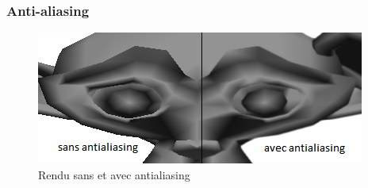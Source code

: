 \documentclass{beamer}
\begin{document}
\begin{frame}
\frametitle{Anti-aliasing}
\begin{figure}
\centering
\includegraphics[scale=0.8]{antialiasing.png}
\caption{Rendu sans et avec antialiasing}
\end{figure}

\end{frame}

\end{document}
